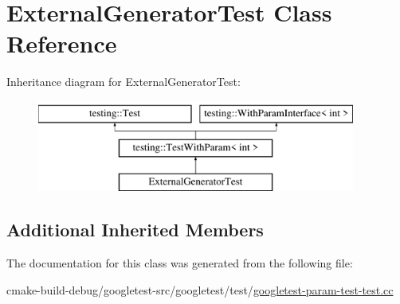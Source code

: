 \hypertarget{classExternalGeneratorTest}{}\section{External\+Generator\+Test Class Reference}
\label{classExternalGeneratorTest}
Inheritance diagram for External\+Generator\+Test\+:\begin{figure}[H]
\begin{center}
\leavevmode
\includegraphics[height=3.000000cm]{classExternalGeneratorTest}
\end{center}
\end{figure}
\subsection*{Additional Inherited Members}


The documentation for this class was generated from the following file\+:\begin{DoxyCompactItemize}
\item 
cmake-\/build-\/debug/googletest-\/src/googletest/test/\mbox{\hyperlink{googletest-param-test-test_8cc}{googletest-\/param-\/test-\/test.\+cc}}\end{DoxyCompactItemize}
